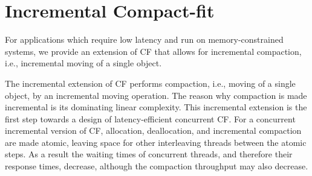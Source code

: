 \documentclass{amsart}
\begin{document}
\section{Incremental Compact-fit}
\label{sec:inc-cf}

For applications which require low latency and run on
memory-constrained systems, we provide an extension of CF that allows
for incremental compaction, i.e., incremental moving of a single
object.

The incremental extension of CF performs compaction, i.e., moving of a
single object, by an incremental moving operation. The reason why
compaction is made incremental is its dominating linear complexity.
This incremental extension is the first step towards a design of
latency-efficient concurrent CF.  For a concurrent incremental version
of CF, allocation, deallocation, and incremental compaction are made
atomic, leaving space for other interleaving threads between the
atomic steps. As a result the waiting times of concurrent threads, and
therefore their response times, decrease, although the compaction
throughput may also decrease.
\end{document}
